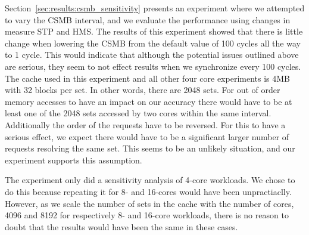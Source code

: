 Section~\ref{sec:results:csmb_sensitivity} presents an experiment where we attempted to vary the CSMB interval, and we evaluate the performance using changes in measure STP and HMS.
The results of this experiment showed that there is little change when lowering the CSMB from the default value of 100 cycles all the way to 1 cycle.
This would indicate that although the potential issues outlined above are serious, they seem to not effect results when we synchronize every 100 cycles.
The cache used in this experiment and all other four core experiments is 4MB with 32 blocks per set.
In other words, there are 2048 sets.
For out of order memory accesses to have an impact on our accuracy there would have to be at least one of the 2048 sets accessed by two cores within the same interval.
Additionally the order of the requests have to be reversed.
For this to have a serious effect, we expect there would have to be a significant larger number of requests resolving the same set.
This seems to be an unlikely situation, and our experiment supports this assumption.

The experiment only did a sensitivity analysis of 4-core workloads. 
We chose to do this because repeating it for 8- and 16-cores would have been unpractiaclly. 
However, as we scale the number of sets in the cache with the number of cores, 4096 and 8192 for respectively 8- and 16-core workloads, there is no reason to doubt that the results would have been the same in these cases.
